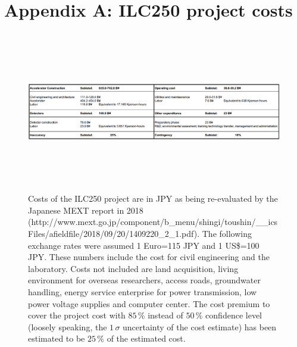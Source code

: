 \documentclass[%
 reprint,
 amsmath,amssymb,
 aps,
]{revtex4-1}
\begin{document}
\vspace{-.4cm}

%


\vspace{-.3cm}

\onecolumngrid
\newpage

\appendix


\section*{\label{Appendix1} \Large{Appendix A: ILC250 project costs}} 

\begin{figure}[ht]
 \begin{center}
 \includegraphics[width=18cm, height=7cm]{figures/Cost.png}
\caption{Costs of the ILC250 project are in JPY as being re-evaluated by the Japanese MEXT report in 2018 (http://www.mext.go.jp/component/b\_menu/shingi/toushin/\_\_icsFiles/afieldfile/2018/09/20/1409220\_2\_1.pdf). 
The following exchange rates were assumed 1 Euro=115 JPY and 1 US\$=100 JPY. These numbers include the cost for civil engineering and the laboratory. Costs not included are land acquisition, living environment for overseas researchers, access roads, groundwater handling, energy service enterprise for power transmission, low power voltage supplies and computer center. The cost premium to cover the project cost with $85\,\%$ instead of
$50\,\%$ confidence level (loosely speaking, the $1\,\sigma$ 
uncertainty of the cost estimate) has been estimated
 to be $25\,\%$ of the estimated cost. 
 \label{Cost}}
 \end{center}
 \end{figure}
\end{document}
